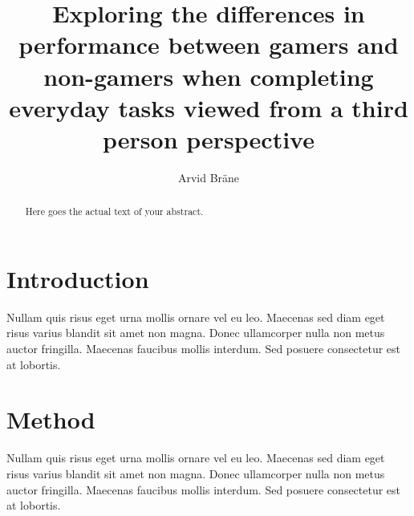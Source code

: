 \documentclass[runningheads,a4paper,oribibl]{llncs}
\begin{document}
\pagestyle{headings}

\mainmatter

\title{Exploring the differences in performance between gamers and non-gamers when completing everyday tasks viewed from a third person perspective}



\author{Arvid Bräne}


\maketitle

\begin{abstract}
	Here goes the actual text of your abstract.
\end{abstract}

\section{Introduction}
Nullam quis risus eget urna mollis ornare vel eu leo. Maecenas sed diam eget risus varius blandit sit amet non magna. Donec ullamcorper nulla non metus auctor fringilla. Maecenas faucibus mollis interdum. Sed posuere consectetur est at lobortis.

\section{Method}
Nullam quis risus eget urna mollis ornare vel eu leo. Maecenas sed diam eget risus varius blandit sit amet non magna. Donec ullamcorper nulla non metus auctor fringilla. Maecenas faucibus mollis interdum. Sed posuere consectetur est at lobortis.





\end{document}
